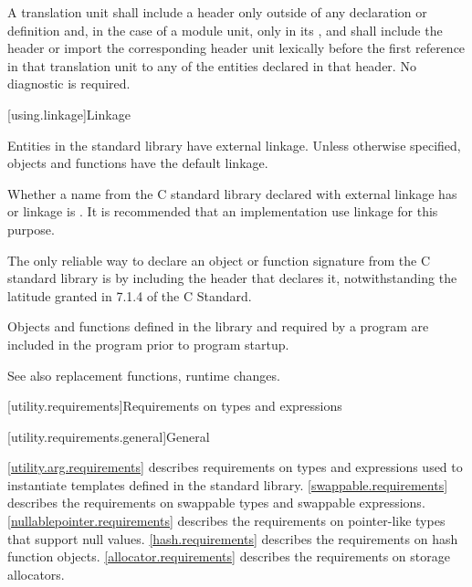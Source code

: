 \pnum
A translation unit shall include a header only outside of any
%
declaration or definition and,
in the case of a module unit,
only in its , and
shall include the header or import the corresponding header unit lexically
before the first reference in that translation unit to any of the entities
declared in that header. No diagnostic is required.

[using.linkage]{Linkage}

\pnum
Entities in the \Cpp{} standard library have external linkage.
Unless otherwise specified, objects and functions have the default
linkage.

\pnum
{}%
Whether a name from the C standard library declared with
external linkage has
%
%
%
or
%
linkage is . It is recommended that an
implementation use
linkage for this purpose.
\begin{footnote}
The only reliable way to declare an object or
function signature from the C standard library is by including the header that
declares it, notwithstanding the latitude granted in 7.1.4 of the C
Standard.
\end{footnote}

\pnum
Objects and functions
defined in the library and required by a \Cpp{} program are included in
the program prior to program startup.

%
\pnum
See also
replacement functions,
runtime changes.

[utility.requirements]{Requirements on types and expressions}

[utility.requirements.general]{General}

\pnum
\ref{utility.arg.requirements}
describes requirements on types and expressions used to instantiate templates
defined in the \Cpp{} standard library.
\ref{swappable.requirements} describes the requirements on swappable types and
swappable expressions.
\ref{nullablepointer.requirements} describes the requirements on pointer-like
types that support null values.
\ref{hash.requirements} describes the requirements on hash function objects.
\ref{allocator.requirements} describes the requirements on storage
allocators.

